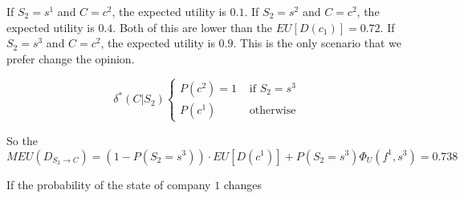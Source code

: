 If $S_2 = s^1$ and $C = c^2$, the expected utility is $0.1$.
If $S_2 = s^2$ and $C = c^2$, the expected utility is $0.4$. 
Both of this are lower than the $EU[D(c_1)] = 0.72$.
If $S_2 = s^3$ and $C = c^2$, the expected utility is $0.9$.
This is the only scenario that we prefer change the opinion.

 \begin{equation}
  \delta^*(C|S_2)
      \begin{cases}
       P(c^2) = 1 & \text{ if } S_2 = s^3 \\
       P(c^1) & \text{ otherwise }
      \end{cases}
 \end{equation}
 
 So the 
 \begin{equation}
  MEU(D_{S_2 \rightarrow C}) =  (1-P(S_2 = s^3)) \cdot EU[D(c^1)] + P(S_2 = s^3) \Phi_U(f^1,s^3) = 0.738
 \end{equation}
 
 If the probability of the state of company $1$ changes

